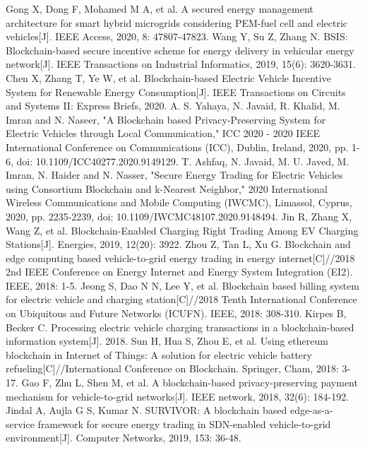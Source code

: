 \begin{thebibliography}{99}
 Gong X, Dong F, Mohamed M A, et al. A secured energy management architecture for smart hybrid microgrids considering PEM-fuel cell and electric vehicles[J]. IEEE Access, 2020, 8: 47807-47823.
 Wang Y, Su Z, Zhang N. BSIS: Blockchain-based secure incentive scheme for energy delivery in vehicular energy network[J]. IEEE Transactions on Industrial Informatics, 2019, 15(6): 3620-3631.
 Chen X, Zhang T, Ye W, et al. Blockchain-based Electric Vehicle Incentive System for Renewable Energy Consumption[J]. IEEE Transactions on Circuits and Systems II: Express Briefs, 2020.
 A. S. Yahaya, N. Javaid, R. Khalid, M. Imran and N. Naseer, "A Blockchain based Privacy-Preserving System for Electric Vehicles through Local Communication," ICC 2020 - 2020 IEEE International Conference on Communications (ICC), Dublin, Ireland, 2020, pp. 1-6, doi: 10.1109/ICC40277.2020.9149129.
 T. Ashfaq, N. Javaid, M. U. Javed, M. Imran, N. Haider and N. Nasser, "Secure Energy Trading for Electric Vehicles using Consortium Blockchain and k-Nearest Neighbor," 2020 International Wireless Communications and Mobile Computing (IWCMC), Limassol, Cyprus, 2020, pp. 2235-2239, doi: 10.1109/IWCMC48107.2020.9148494.
 Jin R, Zhang X, Wang Z, et al. Blockchain-Enabled Charging Right Trading Among EV Charging Stations[J]. Energies, 2019, 12(20): 3922.
 Zhou Z, Tan L, Xu G. Blockchain and edge computing based vehicle-to-grid energy trading in energy internet[C]//2018 2nd IEEE Conference on Energy Internet and Energy System Integration (EI2). IEEE, 2018: 1-5.
 Jeong S, Dao N N, Lee Y, et al. Blockchain based billing system for electric vehicle and charging station[C]//2018 Tenth International Conference on Ubiquitous and Future Networks (ICUFN). IEEE, 2018: 308-310.
 Kirpes B, Becker C. Processing electric vehicle charging transactions in a blockchain-based information system[J]. 2018.
 Sun H, Hua S, Zhou E, et al. Using ethereum blockchain in Internet of Things: A solution for electric vehicle battery refueling[C]//International Conference on Blockchain. Springer, Cham, 2018: 3-17.
 Gao F, Zhu L, Shen M, et al. A blockchain-based privacy-preserving payment mechanism for vehicle-to-grid networks[J]. IEEE network, 2018, 32(6): 184-192.
 Jindal A, Aujla G S, Kumar N. SURVIVOR: A blockchain based edge-as-a-service framework for secure energy trading in SDN-enabled vehicle-to-grid environment[J]. Computer Networks, 2019, 153: 36-48.

\end{thebibliography}
